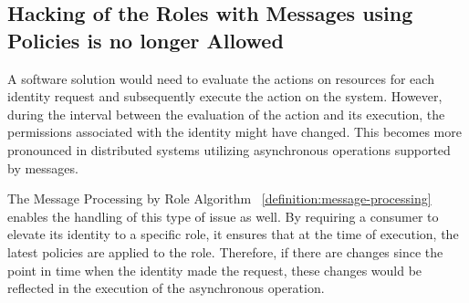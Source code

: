 \vspace{15pt}

\subsection{Hacking of the Roles with Messages using Policies is no longer Allowed}
\label{sec:hacking-republish-message-solution}

A software solution would need to evaluate the actions on resources for each identity request and subsequently execute the action on the system. 
However, during the interval between the evaluation of the action and its execution, the permissions associated with the identity might have changed.
This becomes more pronounced in distributed systems utilizing asynchronous operations supported by messages.

The Message Processing by Role Algorithm ~\ref{definition:message-processing} enables the handling of this type of issue as well. 
By requiring a consumer to elevate its identity to a specific role, it ensures that at the time of execution, the latest policies are applied to the role. 
Therefore, if there are changes since the point in time when the identity made the request, these changes would be reflected in the execution of the asynchronous operation.
